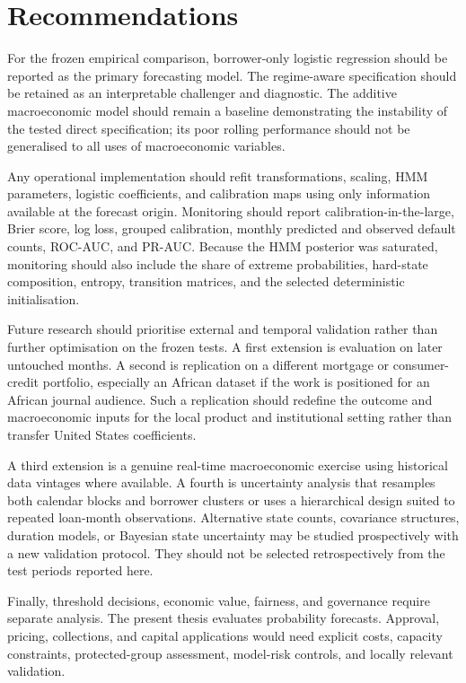 \section{Recommendations}

For the frozen empirical comparison, borrower-only logistic regression should be reported as the primary forecasting model. The regime-aware specification should be retained as an interpretable challenger and diagnostic. The additive macroeconomic model should remain a baseline demonstrating the instability of the tested direct specification; its poor rolling performance should not be generalised to all uses of macroeconomic variables.

Any operational implementation should refit transformations, scaling, HMM parameters, logistic coefficients, and calibration maps using only information available at the forecast origin. Monitoring should report calibration-in-the-large, Brier score, log loss, grouped calibration, monthly predicted and observed default counts, ROC-AUC, and PR-AUC. Because the HMM posterior was saturated, monitoring should also include the share of extreme probabilities, hard-state composition, entropy, transition matrices, and the selected deterministic initialisation.

Future research should prioritise external and temporal validation rather than further optimisation on the frozen tests. A first extension is evaluation on later untouched months. A second is replication on a different mortgage or consumer-credit portfolio, especially an African dataset if the work is positioned for an African journal audience. Such a replication should redefine the outcome and macroeconomic inputs for the local product and institutional setting rather than transfer United States coefficients.

A third extension is a genuine real-time macroeconomic exercise using historical data vintages where available. A fourth is uncertainty analysis that resamples both calendar blocks and borrower clusters or uses a hierarchical design suited to repeated loan-month observations. Alternative state counts, covariance structures, duration models, or Bayesian state uncertainty may be studied prospectively with a new validation protocol. They should not be selected retrospectively from the test periods reported here.

Finally, threshold decisions, economic value, fairness, and governance require separate analysis. The present thesis evaluates probability forecasts. Approval, pricing, collections, and capital applications would need explicit costs, capacity constraints, protected-group assessment, model-risk controls, and locally relevant validation.

